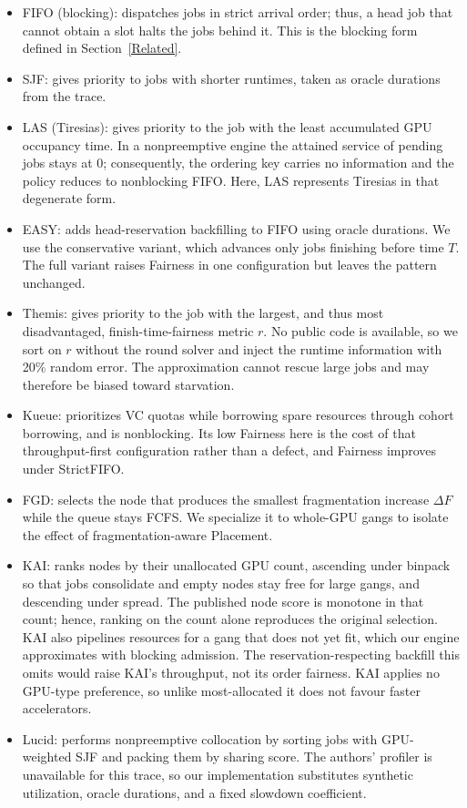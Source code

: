 \documentclass{ieeetj}
\begin{document}
\begin{itemize}
\item FIFO (blocking): dispatches jobs in strict arrival order; thus, a head job that cannot obtain a slot halts the jobs behind it. This is the blocking form defined in Section~\ref{Related}.
\item SJF: gives priority to jobs with shorter runtimes, taken as oracle durations from the trace.
\item LAS (Tiresias): gives priority to the job with the least accumulated GPU occupancy time. In a nonpreemptive engine the attained service of pending jobs stays at 0; consequently, the ordering key carries no information and the policy reduces to nonblocking FIFO. Here, LAS represents Tiresias in that degenerate form.
\item EASY: adds head-reservation backfilling to FIFO using oracle durations. We use the conservative variant, which advances only jobs finishing before time $T$. The full variant raises Fairness in one configuration but leaves the pattern unchanged.
\item Themis: gives priority to the job with the largest, and thus most disadvantaged, finish-time-fairness metric $r$. No public code is available, so we sort on $r$ without the round solver and inject the runtime information with 20\% random error. The approximation cannot rescue large jobs and may therefore be biased toward starvation.
\item Kueue: prioritizes VC quotas while borrowing spare resources through cohort borrowing, and is nonblocking. Its low Fairness here is the cost of that throughput-first configuration rather than a defect, and Fairness improves under StrictFIFO.
\item FGD: selects the node that produces the smallest fragmentation increase $\Delta F$ while the queue stays FCFS. We specialize it to whole-GPU gangs to isolate the effect of fragmentation-aware Placement.
\item KAI: ranks nodes by their unallocated GPU count, ascending under binpack so that jobs consolidate and empty nodes stay free for large gangs, and descending under spread. The published node score is monotone in that count; hence, ranking on the count alone reproduces the original selection. KAI also pipelines resources for a gang that does not yet fit, which our engine approximates with blocking admission. The reservation-respecting backfill this omits would raise KAI's throughput, not its order fairness. KAI applies no GPU-type preference, so unlike most-allocated it does not favour faster accelerators.
\item Lucid: performs nonpreemptive collocation by sorting jobs with GPU-weighted SJF and packing them by sharing score. The authors' profiler is unavailable for this trace, so our implementation substitutes synthetic utilization, oracle durations, and a fixed slowdown coefficient.
\end{itemize}
\end{document}
